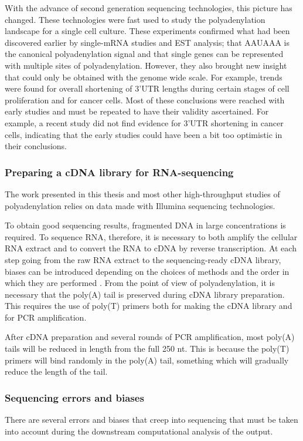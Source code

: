 With the advance of second generation sequencing technologies, this picture has
changed. These technologies were fast used to study the polyadenylation
landscape for a single cell culture. These experiments confirmed what had been
discovered earlier by single-mRNA studies and EST analysis; that AAUAAA is the
canonical polyadenylation signal and that single genes can be represented
with multiple sites of polyadenylation. However, they also brought new insight
that could only be obtained with the genome wide scale. For example, trends
were found for overall shortening of 3'UTR lengths during certain stages of
cell proliferation and for cancer cells. Most of these conclusions were reached
with early studies and must be repeated to have their validity ascertained. For
example, a recent study did not find evidence for 3'UTR shortening in cancer
cells, indicating that the early studies could have been a bit too optimistic
in their conclusions.

\subsubsection{Preparing a cDNA library for RNA-sequencing}
The work presented in this thesis and most other high-throughput studies of
polyadenylation relies on data made with Illumina sequencing technologies.

To obtain good sequencing results, fragmented DNA in large concentrations is
required. To sequence RNA, therefore, it is necessary to both amplify the
cellular RNA extract and to convert the RNA to cDNA by reverse transcription.
At each step going from the raw RNA extract to the sequencing-ready cDNA
library, biases can be introduced depending on the choices of methods and the
order in which they are performed \cite{wang_rna-seq:_2009}. From the point of
view of polyadenylation, it is necessary that the poly(A) tail is preserved
during cDNA library preparation. This requires the use of poly(T) primers both for
making the cDNA library and for PCR amplification.

After cDNA preparation and  several rounds of PCR amplification, most poly(A)
tails will be reduced in length from the full 250 nt. This is because the
poly(T) primers will bind randomly in the poly(A) tail, something which will
gradually reduce the length of the tail.

\subsubsection{Sequencing errors and biases}
There are several errors and biases that creep into sequencing that must be
taken into account during the downstream computational analysis of the output.

